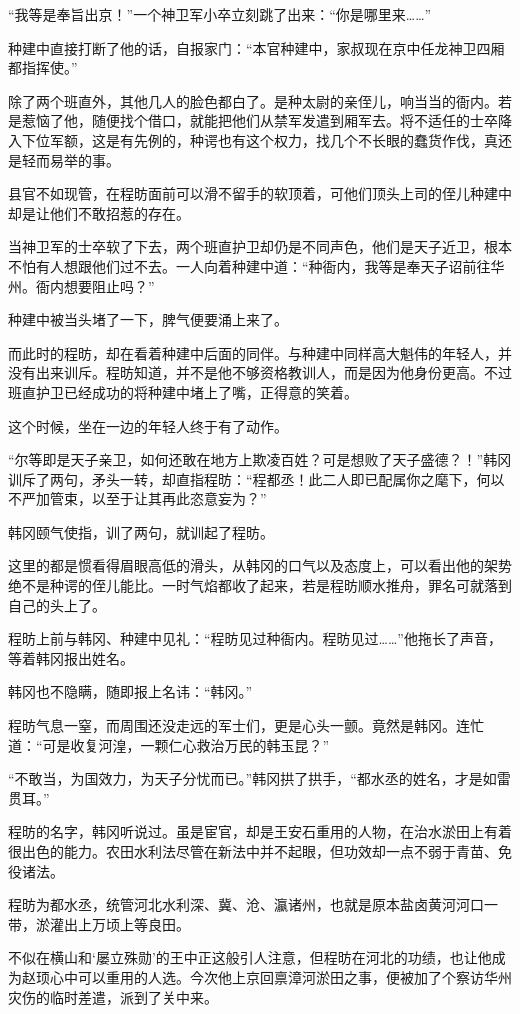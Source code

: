 “我等是奉旨出京！”一个神卫军小卒立刻跳了出来：“你是哪里来……”

种建中直接打断了他的话，自报家门：“本官种建中，家叔现在京中任龙神卫四厢都指挥使。”

除了两个班直外，其他几人的脸色都白了。是种太尉的亲侄儿，响当当的衙内。若是惹恼了他，随便找个借口，就能把他们从禁军发遣到厢军去。将不适任的士卒降入下位军额，这是有先例的，种谔也有这个权力，找几个不长眼的蠢货作伐，真还是轻而易举的事。

县官不如现管，在程昉面前可以滑不留手的软顶着，可他们顶头上司的侄儿种建中却是让他们不敢招惹的存在。

当神卫军的士卒软了下去，两个班直护卫却仍是不同声色，他们是天子近卫，根本不怕有人想跟他们过不去。一人向着种建中道：“种衙内，我等是奉天子诏前往华州。衙内想要阻止吗？”

种建中被当头堵了一下，脾气便要涌上来了。

而此时的程昉，却在看着种建中后面的同伴。与种建中同样高大魁伟的年轻人，并没有出来训斥。程昉知道，并不是他不够资格教训人，而是因为他身份更高。不过班直护卫已经成功的将种建中堵上了嘴，正得意的笑着。

这个时候，坐在一边的年轻人终于有了动作。

“尔等即是天子亲卫，如何还敢在地方上欺凌百姓？可是想败了天子盛德？！”韩冈训斥了两句，矛头一转，却直指程昉：“程都丞！此二人即已配属你之麾下，何以不严加管束，以至于让其再此恣意妄为？”

韩冈颐气使指，训了两句，就训起了程昉。

这里的都是惯看得眉眼高低的滑头，从韩冈的口气以及态度上，可以看出他的架势绝不是种谔的侄儿能比。一时气焰都收了起来，若是程昉顺水推舟，罪名可就落到自己的头上了。

程昉上前与韩冈、种建中见礼：“程昉见过种衙内。程昉见过……”他拖长了声音，等着韩冈报出姓名。

韩冈也不隐瞒，随即报上名讳：“韩冈。”

程昉气息一窒，而周围还没走远的军士们，更是心头一颤。竟然是韩冈。连忙道：“可是收复河湟，一颗仁心救治万民的韩玉昆？”

“不敢当，为国效力，为天子分忧而已。”韩冈拱了拱手，“都水丞的姓名，才是如雷贯耳。”

程昉的名字，韩冈听说过。虽是宦官，却是王安石重用的人物，在治水淤田上有着很出色的能力。农田水利法尽管在新法中并不起眼，但功效却一点不弱于青苗、免役诸法。

程昉为都水丞，统管河北水利深、冀、沧、瀛诸州，也就是原本盐卤黄河河口一带，淤灌出上万顷上等良田。

不似在横山和‘屡立殊勋’的王中正这般引人注意，但程昉在河北的功绩，也让他成为赵顼心中可以重用的人选。今次他上京回禀漳河淤田之事，便被加了个察访华州灾伤的临时差遣，派到了关中来。

